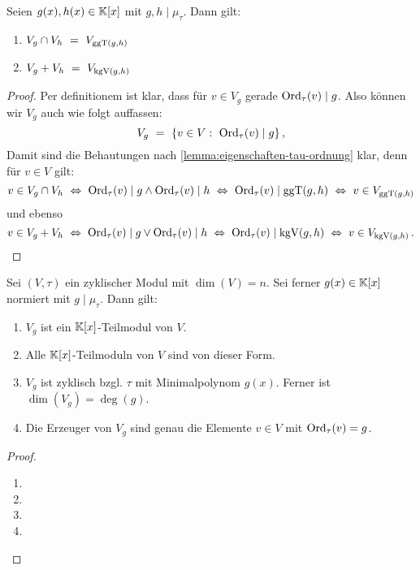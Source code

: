 \begin{lemma}
  Seien $g(x), h(x) \in \mathbb{K}[x]$ mit $g,h \mid \mu_\tau$. Dann gilt:
  \begin{enumerate}
    \item $V_g \cap V_h \ =\  V_{\operatorname{ggT}(g,h)}$
    \item $V_g + V_h \ =\  V_{\operatorname{kgV}(g,h)}$
  \end{enumerate}
\end{lemma}
\begin{proof}
  Per definitionem ist klar, dass für $v \in V_g$ gerade
  $\operatorname{Ord}_\tau(v) \mid g$. Also können wir $V_g$ auch wie folgt auffassen:
  \[ V_g \ =\  \{ v\in V:\ \operatorname{Ord}_\tau(v) \mid g\} \,,\]
  Damit sind die Behautungen nach \cref{lemma:eigenschaften-tau-ordnung} klar,
  denn für $v \in V$ gilt:
  \[ v\in V_g \cap V_h \ \Leftrightarrow\  
    \operatorname{Ord}_\tau(v) \mid g \land \operatorname{Ord}_\tau(v) \mid h \ \Leftrightarrow\ 
    \operatorname{Ord}_\tau(v) \mid \operatorname{ggT}(g,h) \ \Leftrightarrow\  v \in V_{\operatorname{ggT}(g,h)}\]
  und ebenso
  \[ v \in V_g + V_h \ \Leftrightarrow\  
    \operatorname{Ord}_\tau(v) \mid g \lor \operatorname{Ord}_\tau(v) \mid h \ \Leftrightarrow\ 
    \operatorname{Ord}_\tau(v) \mid \operatorname{kgV}(g,h) \ \Leftrightarrow\  v \in V_{\operatorname{kgV}(g,h)}\,.\]
\end{proof}


\begin{satz}
  Sei $(V,\tau)$ ein zyklischer Modul mit $\dim(V) = n$. Sei ferner 
  $g(x)\in \mathbb{K}[x]$ normiert mit $g\mid \mu_\tau$. Dann gilt:
  \begin{enumerate}
    \item $V_g$ ist ein $\mathbb{K}[x]$-Teilmodul von $V$.
    \item Alle $\mathbb{K}[x]$-Teilmoduln von $V$ sind von dieser Form.
    \item $V_g$ ist zyklisch bzgl. $\tau$ mit Minimalpolynom $g(x)$.
      Ferner ist $\dim(V_g) = \deg(g)$.
    \item Die Erzeuger von $V_g$ sind genau die Elemente $v\in V$ mit 
      $\operatorname{Ord}_\tau(v) = g$.
  \end{enumerate}
\end{satz}
\begin{proof}
  \begin{enumerate}
    \item 
    \item
    \item
    \item
  \end{enumerate}
\end{proof}
